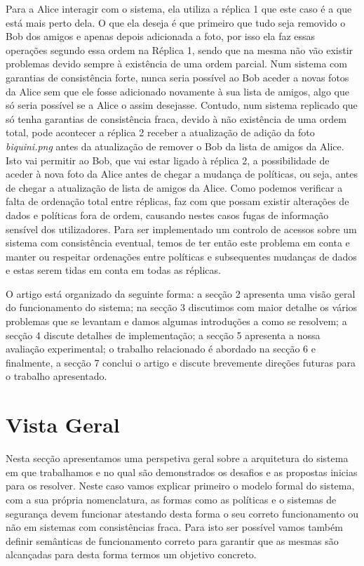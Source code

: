 \documentclass[runningheads,a4paper]{llncs}
\begin{document}
Para a Alice interagir com o sistema, ela utiliza a réplica 1 que este caso é a que está mais perto dela. O que ela deseja é que primeiro que tudo seja removido o Bob dos amigos e apenas depois adicionada a foto, por isso ela faz essas operações segundo essa ordem na Réplica 1, sendo que na mesma não vão existir problemas devido sempre à existência de uma ordem parcial. Num sistema com garantias de consistência forte, nunca seria possível ao Bob aceder a novas fotos da Alice sem que ele fosse adicionado novamente à sua lista de amigos, algo que só seria possível se a Alice o assim desejasse. Contudo, num sistema replicado que só tenha garantias de consistência fraca, devido à não existência de uma ordem total, pode acontecer a réplica 2 receber a atualização de adição da foto \textit{biquini.png} antes da atualização de remover o Bob da lista de amigos da Alice. Isto vai permitir ao Bob, que vai estar ligado à réplica 2, a possibilidade de aceder à nova foto da Alice antes de chegar a mudança de políticas, ou seja, antes de chegar a atualização de lista de amigos da Alice.
Como podemos verificar a falta de ordenação total entre réplicas, faz com que possam existir alterações de dados e políticas fora de ordem, causando nestes casos fugas de informação sensível dos utilizadores. Para ser implementado um controlo de acessos sobre um sistema com consistência eventual, temos de ter então este problema em conta e manter ou respeitar ordenações entre políticas e subsequentes mudanças de dados e estas serem tidas em conta em todas as réplicas.

O artigo está organizado da seguinte forma: a secção 2 apresenta uma visão geral do funcionamento do sistema; na secção 3 discutimos com maior detalhe os vários problemas que se levantam e damos algumas introduções a como se resolvem; a secção 4 discute detalhes de implementação; a secção 5 apresenta a nossa avaliação experimental; o trabalho relacionado é abordado na secção 6 e finalmente, a secção 7 conclui o artigo e discute brevemente direções futuras para o trabalho apresentado.


\section{Vista Geral}\label{sec:vg}

Nesta secção apresentamos uma perspetiva geral sobre a arquitetura do sistema em que trabalhamos e no qual são demonstrados os desafios e as propostas inicias para os resolver. Neste caso vamos explicar primeiro o modelo formal do sistema, com a sua própria nomenclatura, as formas como as políticas e o sistemas de segurança devem funcionar atestando desta forma o seu correto funcionamento ou não em sistemas com consistências fraca.
Para isto ser possível vamos também definir semânticas de funcionamento correto para garantir que as mesmas são alcançadas para desta forma termos um objetivo concreto.
\end{document}
